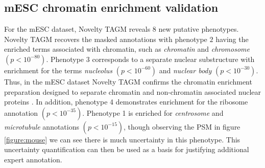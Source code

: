 \documentclass[12pt,english]{article}
\begin{document}
\subsection{mESC chromatin enrichment validation}\label{supplement:mesc}
For the mESC dataset, Novelty TAGM reveals $8$ new putative phenotypes. Novelty TAGM recovers the masked annotations with phenotype $2$ having the enriched terms associated with chromatin, such as \textit{chromatin} and \textit{chromosome} $(p < 10^{-80})$. Phenotype 3 corresponds to a separate nuclear substructure with enrichment for the terms \textit{nucleolus} $(p < 10^{-60})$ and \textit{nuclear body} $(p < 10^{-30})$. Thus, in the mESC dataset Novelty TAGM confirms the chromatin enrichment preparation designed to separate chromatin and non-chromatin associated nuclear proteins \citep{Mulvey:2017}. In addition, phenotype 4 demonstrates enrichment for the ribosome annotation $(p < 10^{-35})$. Phenotype 1 is enriched for \textit{centrosome} and \textit{microtubule} annotations $(p < 10^{-15})$, though observing the PSM in figure \ref{figure:mouse} we can see there is much uncertainty in this phenotype. This uncertainty quantification can then be used as a basis for justifying additional expert annotation.
\end{document}
